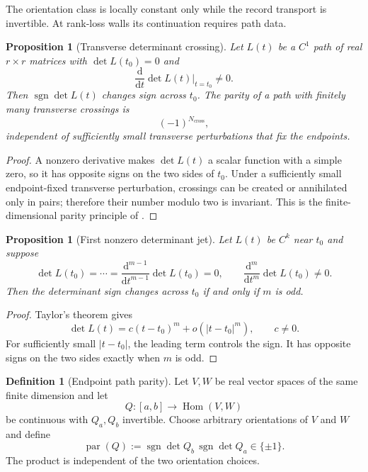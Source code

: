 \documentclass[11pt]{article}
\newtheorem{proposition}[theorem]{Proposition}
\theoremstyle{definition}
\newtheorem{definition}[theorem]{Definition}
\theoremstyle{remark}
\newcommand{\sgn}{\operatorname{sgn}}
\newcommand{\Hom}{\operatorname{Hom}}
\newcommand{\dd}{\mathrm d}
\begin{document}
The orientation class is locally constant only while the record transport is
invertible.  At rank-loss walls its continuation requires path data.

\begin{proposition}[Transverse determinant crossing]
\label{prop:det-crossing}
Let $L(t)$ be a $C^1$ path of real $r\times r$ matrices with
$\det L(t_0)=0$ and
\[
 \frac{\dd}{\dd t}\det L(t)\bigg|_{t=t_0}\ne0.
\]
Then $\sgn\det L(t)$ changes sign across $t_0$.  The parity of a path with
finitely many transverse crossings is
\[
 (-1)^{N_{\mathrm{cross}}},
\]
independent of sufficiently small transverse perturbations that fix the
endpoints.
\end{proposition}

\begin{proof}
A nonzero derivative makes $\det L(t)$ a scalar function with a simple zero,
so it has opposite signs on the two sides of $t_0$.  Under a sufficiently
small endpoint-fixed transverse perturbation, crossings can be created or
annihilated only in pairs; therefore their number modulo two is invariant.
This is the finite-dimensional parity principle of
\cite{FitzpatrickPejsachowicz1991,DollSchulzBaldesWaterstraat2019}.
\end{proof}

\begin{proposition}[First nonzero determinant jet]
\label{prop:det-jet}
Let $L(t)$ be $C^k$ near $t_0$ and suppose
\[
 \det L(t_0)=\cdots=\frac{\dd^{m-1}}{\dd t^{m-1}}\det L(t_0)=0,
 \qquad
 \frac{\dd^m}{\dd t^m}\det L(t_0)\ne0.
\]
Then the determinant sign changes across $t_0$ if and only if $m$ is odd.
\end{proposition}

\begin{proof}
Taylor's theorem gives
\[
 \det L(t)=c(t-t_0)^m+o(|t-t_0|^m),
 \qquad c\ne0.
\]
For sufficiently small $|t-t_0|$, the leading term controls the sign.  It has
opposite signs on the two sides exactly when $m$ is odd.
\end{proof}

\begin{definition}[Endpoint path parity]
\label{def:determinant-path-parity}
Let \(V,W\) be real vector spaces of the same finite dimension and let
\[
 Q:[a,b]\longrightarrow\Hom(V,W)
\]
be continuous with \(Q_a,Q_b\) invertible.  Choose arbitrary orientations of
\(V\) and \(W\) and define
\[
 \operatorname{par}(Q)
 :=
 \sgn\det Q_b\,\sgn\det Q_a
 \in\{\pm1\}.
\]
The product is independent of the two orientation choices.
\end{definition}
\end{document}
